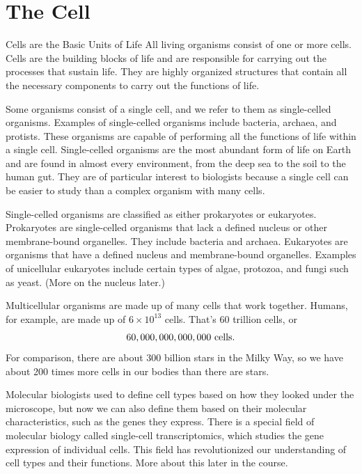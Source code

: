 \section{The Cell}

Cells are the Basic Units of Life
\reversemarginpar
{}
\normalmarginpar
All living organisms consist of one or more cells. Cells are the building blocks of life and are responsible for carrying out the processes that sustain life. They are highly organized structures that contain all the necessary components to carry out the functions of life. 

Some organisms consist of a single cell, and we refer to them as single-celled organisms. Examples of single-celled organisms include bacteria, archaea, and protists. These organisms are capable of performing all the functions of life within a single cell. Single-celled organisms are the most abundant form of life on Earth and are found in almost every environment, from the deep sea to the soil to the human gut. They are of particular interest to biologists because a single cell can be easier to study than a complex organism with many cells. 

Single-celled organisms are classified as either prokaryotes or eukaryotes. Prokaryotes are single-celled organisms that lack a defined nucleus or other membrane-bound organelles. They include bacteria and archaea. Eukaryotes are organisms that have a defined nucleus and membrane-bound organelles. Examples of unicellular eukaryotes include certain types of algae, protozoa, and fungi such as yeast. (More on the nucleus later.)

Multicellular organisms are made up of many cells that work together. Humans, for example, are made up of \(6 \times 10^{13}\) cells. That's 60 trillion cells, or
$$ 60,000,000,000,000 {\ \rm cells}. $$
For comparison, there are about 300 billion stars in the Milky Way, so we have about 200 times more cells in our bodies than there are stars.

Molecular biologists used to define cell types based on how they looked under the microscope, but now we can also define them based on their molecular characteristics, such as the genes they express. There is a special field of molecular biology called single-cell transcriptomics, which studies the gene expression of individual cells. This field has revolutionized our understanding of cell types and their functions. More about this later in the course.

